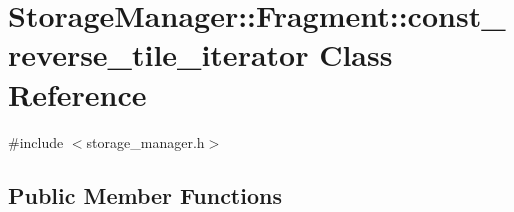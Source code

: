 \hypertarget{classStorageManager_1_1Fragment_1_1const__reverse__tile__iterator}{}\section{Storage\+Manager\+:\+:Fragment\+:\+:const\+\_\+reverse\+\_\+tile\+\_\+iterator Class Reference}
\label{classStorageManager_1_1Fragment_1_1const__reverse__tile__iterator}


{\ttfamily \#include $<$storage\+\_\+manager.\+h$>$}

\subsection*{Public Member Functions}
